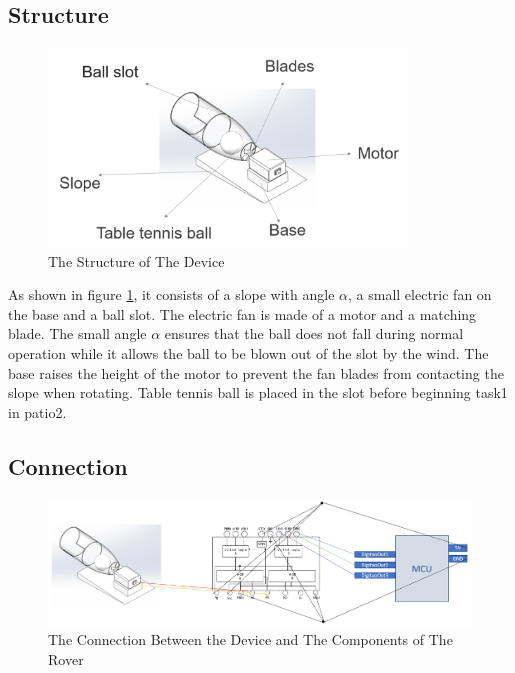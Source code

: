 \documentclass[12pt, a4paper, oneside]{report}
\begin{document}
\subsection{Structure}

\begin{figure}[H]
  \centering
  \includegraphics[width=0.85\textwidth]{pic/Table tennis/12.png}
  \caption{The Structure of The Device}
  \label{fig:tb4}
\end{figure}

As shown in figure \ref{fig:tb4}, it consists of a slope with angle $\alpha$, a small electric fan on the base and a ball slot. The electric fan is made of a motor and a matching blade. The small angle $\alpha$ ensures that the ball does not fall during normal operation while it allows the ball to be blown out of the slot by the wind. The base raises the height of the motor to prevent the fan blades from contacting the slope when rotating. Table tennis ball is placed in the slot before beginning task1 in patio2.  

\subsection{Connection}

\begin{figure}[H]
  \centering
  \includegraphics[width=1\textwidth]{pic/Table tennis/13.png}
  \caption{The Connection Between the Device and The Components of The Rover}
  \label{fig:tb5}
\end{figure}
\end{document}
